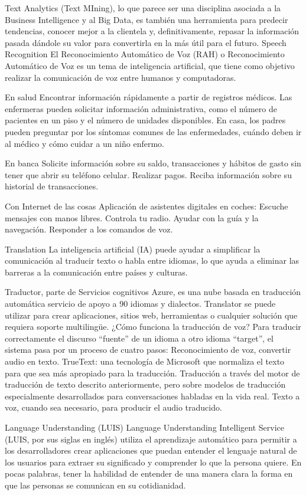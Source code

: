 Text Analytics (Text MIning), lo que parece ser una disciplina asociada a la Business Intelligence y al Big Data, es también una herramienta para predecir tendencias, conocer mejor a la clientela y, definitivamente, repasar la información pasada dándole su valor para convertirla en la más útil para el futuro.
Speech Recognition
El Reconocimiento Automático de Voz (RAH) o Reconocimiento Automático de Voz es un tema de inteligencia artificial, que tiene como objetivo realizar la comunicación de voz entre humanos y computadoras.


En salud
Encontrar información rápidamente a partir de registros médicos.
Las enfermeras pueden solicitar información administrativa, como el número de pacientes en un piso y el número de unidades disponibles.
En casa, los padres pueden preguntar por los síntomas comunes de las enfermedades, cuándo deben ir al médico y cómo cuidar a un niño enfermo.

En banca
Solicite información sobre su saldo, transacciones y hábitos de gasto sin tener que abrir su teléfono celular.
Realizar pagos.
Reciba información sobre su historial de transacciones.

Con Internet de las cosas
Aplicación de asistentes digitales en coches: 
Escuche mensajes con manos libres.
Controla tu radio.
Ayudar con la guía y la navegación.
Responder a los comandos de voz.


Translation
La inteligencia artificial (IA) puede ayudar a simplificar la comunicación al traducir texto o habla entre idiomas, lo que ayuda a eliminar las barreras a la comunicación entre países y culturas.

Traductor, parte de Servicios cognitivos Azure, es una nube basada en traducción automática servicio de apoyo a 90 idiomas y dialectos. Translator se puede utilizar para crear aplicaciones, sitios web, herramientas o cualquier solución que requiera soporte multilingüe.
¿Cómo funciona la traducción de voz?
Para traducir correctamente el discurso “fuente” de un idioma a otro idioma “target”, el sistema pasa por un proceso de cuatro pasos:
Reconocimiento de voz, convertir audio en texto.
TrueText: una tecnología de Microsoft que normaliza el texto para que sea más apropiado para la traducción.
Traducción a través del motor de traducción de texto descrito anteriormente, pero sobre modelos de traducción especialmente desarrollados para conversaciones habladas en la vida real.
Texto a voz, cuando sea necesario, para producir el audio traducido.


Language Understanding (LUIS)
Language Understanding Intelligent Service (LUIS, por sus siglas en inglés) utiliza el aprendizaje automático para permitir a los desarrolladores crear aplicaciones que puedan entender el lenguaje natural de los usuarios para extraer su significado y comprender lo que la persona quiere. En pocas palabras, tener la habilidad de entender de una manera clara la forma en que las personas se comunican en su cotidianidad.



